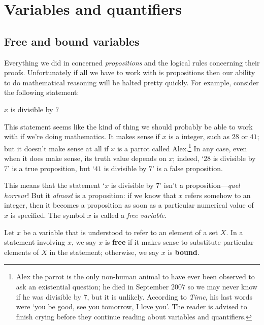 \section{Variables and quantifiers}

\subsection*{Free and bound variables}

Everything we did in  concerned \textit{propositions} and the logical rules concerning their proofs. Unfortunately if all we have to work with is propositions then our ability to do mathematical reasoning will be halted pretty quickly. For example, consider the following statement:
\begin{center}
$x$ is divisible by $7$
\end{center}
This statement seems like the kind of thing we should probably be able to work with if we're doing mathematics. It makes sense if $x$ is a integer, such as $28$ or $41$; but it doesn't make sense at all if $x$ is a parrot called Alex.\footnote{Alex the parrot is the only non-human animal to have ever been observed to ask an existential question; he died in September 2007 so we may never know if he was divisible by $7$, but it is unlikely. According to \textit{Time}, his last words were `you be good, see you tomorrow, I love you'. The reader is advised to finish crying before they continue reading about variables and quantifiers.} In any case, even when it does make sense, its truth value depends on $x$; indeed, `$28$ is divisible by $7$' is a true proposition, but `$41$ is divisible by $7$' is a false proposition.

This means that the statement `$x$ is divisible by $7$' isn't a proposition---\textit{quel horreur}! But it \textit{almost} is a proposition: if we know that $x$ refers somehow to an integer, then it becomes a proposition as soon as a particular numerical value of $x$ is specified. The symbol $x$ is called a \textit{free variable}.

\begin{definition}
\label{defFreeVariable}
Let $x$ be a variable that is understood to refer to an element of a set $X$. In a statement involving $x$, we say $x$ is \textbf{free} if it makes sense to substitute particular elements of $X$ in the statement; otherwise, we say $x$ is \textbf{bound}.
\end{definition}

